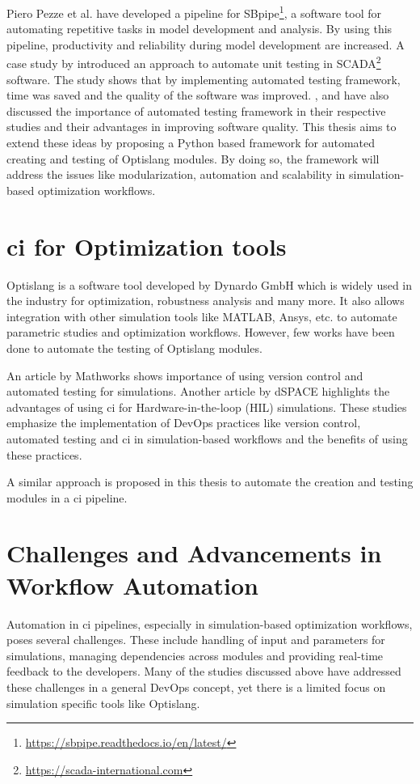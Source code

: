 Piero Pezze et al.\cite{sbpipe} have developed a pipeline for SBpipe\footnote{\url{https://sbpipe.readthedocs.io/en/latest/}}, a software tool for automating repetitive tasks in model development and analysis. By using
this pipeline, productivity and reliability during model development are increased. A case study by \cite{6200132} introduced an approach to automate unit testing 
in SCADA\footnote{\url{https://scada-international.com}} software. The study shows that by implementing automated testing framework, time was saved and the 
quality of the software was improved. \cite{6465286}, \cite{553698} and \cite{6319254} have also discussed the importance of automated testing framework in  
their respective studies and their advantages in improving software quality. This thesis aims to extend these ideas by proposing a Python based framework for 
automated creating and testing of Optislang modules. By doing so, the framework will address the issues like modularization, automation and scalability in 
simulation-based optimization workflows.

\section{\acrlong{ci} for Optimization tools}
Optislang is a software tool developed by Dynardo GmbH which is widely used in the industry for optimization, robustness analysis and many more. It also allows
integration with other simulation tools like MATLAB, Ansys, etc. to automate parametric studies and optimization workflows. However, few works have been done 
to automate the testing of Optislang modules.

An article by Mathworks \cite{mathworks} shows importance of using version control and automated testing for simulations. Another article by dSPACE \cite{dspace}
highlights the advantages of using \acrshort{ci} for Hardware-in-the-loop (HIL) simulations. These studies emphasize the implementation of DevOps practices 
like version control, automated testing and \acrshort{ci} in simulation-based workflows and the benefits of using these practices\cite{windriver}. 

A similar approach is proposed in this thesis to automate the creation and testing  modules in a \acrshort{ci} pipeline.

\section{Challenges and Advancements in Workflow Automation}
Automation in \acrshort{ci} pipelines, especially in simulation-based optimization workflows, poses several challenges. These include handling of input and parameters
for simulations, managing dependencies across modules and providing real-time feedback to the developers. Many of the studies discussed above have addressed 
these challenges in a general DevOps concept, yet there is a limited focus on simulation specific tools like Optislang.

